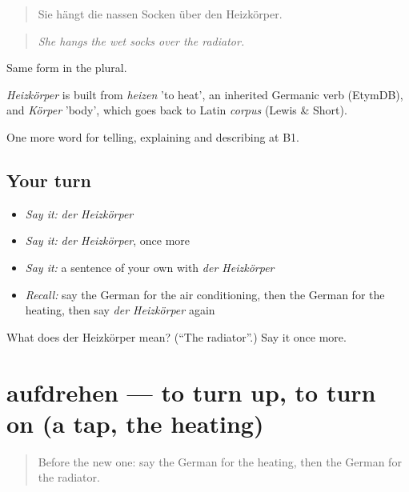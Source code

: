 \begin{quote}
Sie hängt die nassen Socken über den Heizkörper.
\end{quote}

\begin{quote}
\emph{She hangs the wet socks over the radiator.}
\end{quote}

Same form in the plural.

\begin{cousinweb}
\emph{Heizkörper} is built from \emph{heizen} 'to heat', an inherited Germanic verb (EtymDB), and \emph{Körper} 'body', which goes back to Latin \emph{corpus} (Lewis \& Short).
\end{cousinweb}

\begin{grammarlens}[title={What you've built}]
One more word for telling, explaining and describing at B1.
\end{grammarlens}

\subsection*{Your turn}
\begin{itemize}
\raggedright
  \item \emph{Say it:} \emph{der Heizkörper}
  \item \emph{Say it:} \emph{der Heizkörper}, once more
  \item \emph{Say it:} a sentence of your own with \emph{der Heizkörper}
  \item \emph{Recall:} say the German for the air conditioning, then the German for the heating, then say \emph{der Heizkörper} again
\end{itemize}

\begin{tcolorbox}[breakable,colback=teal!4,colframe=teal!35!black,title={Before you move on}]
What does der Heizkörper mean? (\textquotedblleft{}The radiator\textquotedblright{}.) Say it once more.
\end{tcolorbox}
\section[aufdrehen]{aufdrehen — to turn up, to turn on (a tap, the heating)}

\label{lesson:GE-C427-aufdrehen}



\begin{quote}
Before the new one: say the German for the heating, then the German for the radiator.
\end{quote}

